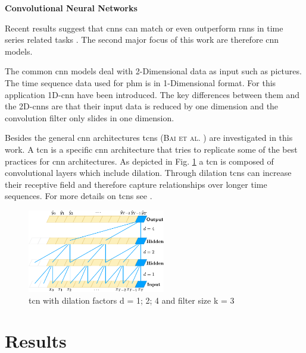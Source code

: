 \documentclass[conference]{IEEEtran}
\begin{document}
\noindent
\textbf{Convolutional Neural Networks}

Recent results suggest that \glspl{cnn} can match or even outperform \glspl{rnn} in time series related tasks \cite{Bai2018}. The second major focus of this work are therefore \gls{cnn} models.

The common \gls{cnn} models deal with 2-Dimensional data as input such as pictures. The time sequence data used for \gls{phm} is in 1-Dimensional format. For this application 1D-\gls{cnn} have been introduced. The key differences between them and the 2D-\glspl{cnn} are that their input data is reduced by one dimension and the convolution filter only slides in one dimension. \cite{Akrim2021}

Besides the general \gls{cnn} architectures \glspl{tcn} (\textsc{Bai et al.} \cite{Bai2018}) are investigated in this work. A \gls{tcn} is a specific \gls{cnn} architecture that tries to replicate some of the best practices for \gls{cnn} architectures. As depicted in Fig. \ref{fig:tcn-architecture} a \gls{tcn} is composed of convolutional layers which include dilation. Through dilation \glspl{tcn} can increase their receptive field and therefore capture relationships over longer time sequences. For more details on \glspl{tcn} see \cite{Bai2018}.

\begin{figure}[htp]
	\centering
	\includegraphics[width=6cm]{tcn_architecture.pdf}
	\caption{\gls{tcn} with dilation factors d = 1; 2; 4 and filter size k = 3 \cite{Bai2018}}
	\label{fig:tcn-architecture}
\end{figure}



\section{Results}
\label{sec:results}
\end{document}
